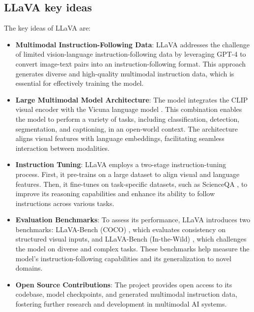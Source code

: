 \documentclass[onecolumn]{IEEEtran}
\begin{document}
\subsection{LLaVA key ideas}
The key ideas of LLaVA are:
\begin{itemize}
    \item \textbf{Multimodal Instruction-Following Data}: LLaVA addresses the challenge of limited vision-language instruction-following data by leveraging GPT-4 to convert image-text pairs into an instruction-following format. This approach generates diverse and high-quality multimodal instruction data, which is essential for effectively training the model.
    \item \textbf{Large Multimodal Model Architecture}: The model integrates the CLIP visual encoder \cite{radford2021learning} with the Vicuna language model \cite{vicuna2023}. This combination enables the model to perform a variety of tasks, including classification, detection, segmentation, and captioning, in an open-world context. The architecture aligns visual features with language embeddings, facilitating seamless interaction between modalities.
    \item \textbf{Instruction Tuning}: LLaVA employs a two-stage instruction-tuning process. First, it pre-trains on a large dataset to align visual and language features. Then, it fine-tunes on task-specific datasets, such as ScienceQA \cite{lu2022learn}, to improve its reasoning capabilities and enhance its ability to follow instructions across various tasks.
    \item \textbf{Evaluation Benchmarks}: To assess its performance, LLaVA introduces two benchmarks: LLaVA-Bench (COCO) \cite{lin2014microsoft}, which evaluates consistency on structured visual inputs, and LLaVA-Bench (In-the-Wild) \cite{githubGitHubComputerVisionintheWildCVinW_Readings}, which challenges the model on diverse and complex tasks. These benchmarks help measure the model’s instruction-following capabilities and its generalization to novel domains.
    \item \textbf{Open Source Contributions}: The project provides open access to its codebase, model checkpoints, and generated multimodal instruction data, fostering further research and development in multimodal AI systems.
\end{itemize}
\end{document}
